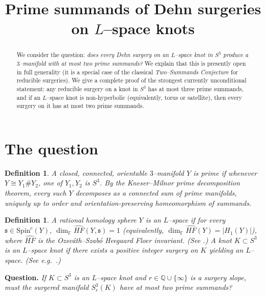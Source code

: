 \documentclass[11pt]{amsart}
\title[Prime summands of surgeries on $L$--space knots]{Prime summands of Dehn surgeries on $L$--space knots}
\author{}
\date{}
\newtheorem{definition}[theorem]{Definition}
\numberwithin{equation}{section}
\begin{document}
\maketitle

\begin{abstract}
We consider the question: \emph{does every Dehn surgery on an $L$--space knot in $S^3$
produce a $3$--manifold with at most two prime summands?}
We explain that this is presently open in full generality (it is a special case of the classical
\emph{Two--Summands Conjecture} for reducible surgeries).  We give a complete proof of the strongest
currently unconditional statement: any reducible surgery on a knot in $S^3$ has at most three prime summands,
and if an $L$--space knot is non-hyperbolic (equivalently, torus or satellite), then every surgery on it has
at most two prime summands.
\end{abstract}

\section{The question}

\begin{definition}
A closed, connected, orientable $3$--manifold $Y$ is \emph{prime} if whenever
$Y\cong Y_1\#Y_2$, one of $Y_1,Y_2$ is $S^3$.
By the Kneser--Milnor prime decomposition theorem, every such $Y$ decomposes as a connected sum of prime
manifolds, uniquely up to order and orientation-preserving homeomorphism of summands.
\end{definition}

\begin{definition}
A rational homology sphere $Y$ is an \emph{$L$--space} if for every $\mathfrak{s}\in \mathrm{Spin}^c(Y)$,
$\dim_{\mathbb{F}}\widehat{HF}(Y,\mathfrak{s})=1$ (equivalently, $\dim_{\mathbb{F}}\widehat{HF}(Y)=|H_1(Y)|$),
where $\widehat{HF}$ is the Ozsv\'ath--Szab\'o Heegaard Floer invariant.  (See \cite{OS04}.)
A knot $K\subset S^3$ is an \emph{$L$--space knot} if there exists a positive integer surgery on $K$
yielding an $L$--space.  (See e.g.\ \cite{HLZ15}.)
\end{definition}

\medskip

\noindent
\textbf{Question.}
\emph{If $K\subset S^3$ is an $L$--space knot and $r\in \mathbb{Q}\cup\{\infty\}$ is a surgery slope,
must the surgered manifold $S^3_r(K)$ have at most two prime summands?}

\medskip
\end{document}
